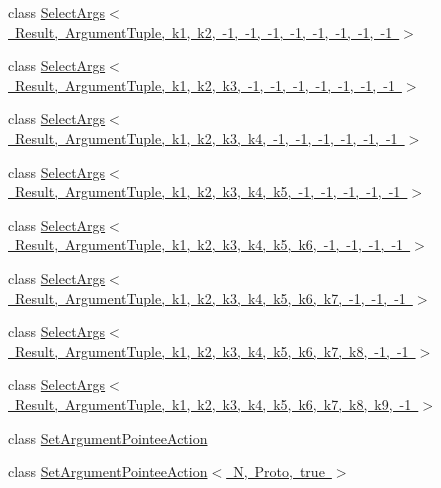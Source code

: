 \begin{DoxyCompactItemize}
\item 
class \mbox{\hyperlink{classtesting_1_1internal_1_1SelectArgs_3_01Result_00_01ArgumentTuple_00_01k1_00_01k2_00_01-1_00_9a332764141890440172b7f06e77bbee}{Select\+Args$<$ Result, Argument\+Tuple, k1, k2, -\/1, -\/1, -\/1, -\/1, -\/1, -\/1, -\/1, -\/1 $>$}}
\item 
class \mbox{\hyperlink{classtesting_1_1internal_1_1SelectArgs_3_01Result_00_01ArgumentTuple_00_01k1_00_01k2_00_01k3_00_4b8877f94cb457a4d2bd6b2630090309}{Select\+Args$<$ Result, Argument\+Tuple, k1, k2, k3, -\/1, -\/1, -\/1, -\/1, -\/1, -\/1, -\/1 $>$}}
\item 
class \mbox{\hyperlink{classtesting_1_1internal_1_1SelectArgs_3_01Result_00_01ArgumentTuple_00_01k1_00_01k2_00_01k3_00_030eb2335b9fd029fe61511c21b4d364}{Select\+Args$<$ Result, Argument\+Tuple, k1, k2, k3, k4, -\/1, -\/1, -\/1, -\/1, -\/1, -\/1 $>$}}
\item 
class \mbox{\hyperlink{classtesting_1_1internal_1_1SelectArgs_3_01Result_00_01ArgumentTuple_00_01k1_00_01k2_00_01k3_00_dabb861d0dfd59e876e4adc8d7e61c25}{Select\+Args$<$ Result, Argument\+Tuple, k1, k2, k3, k4, k5, -\/1, -\/1, -\/1, -\/1, -\/1 $>$}}
\item 
class \mbox{\hyperlink{classtesting_1_1internal_1_1SelectArgs_3_01Result_00_01ArgumentTuple_00_01k1_00_01k2_00_01k3_00_bb7097ad0bebc299c171ea7e2f7fc9a0}{Select\+Args$<$ Result, Argument\+Tuple, k1, k2, k3, k4, k5, k6, -\/1, -\/1, -\/1, -\/1 $>$}}
\item 
class \mbox{\hyperlink{classtesting_1_1internal_1_1SelectArgs_3_01Result_00_01ArgumentTuple_00_01k1_00_01k2_00_01k3_00_39929402cb68b57f60e280a41eb60fed}{Select\+Args$<$ Result, Argument\+Tuple, k1, k2, k3, k4, k5, k6, k7, -\/1, -\/1, -\/1 $>$}}
\item 
class \mbox{\hyperlink{classtesting_1_1internal_1_1SelectArgs_3_01Result_00_01ArgumentTuple_00_01k1_00_01k2_00_01k3_00_5bf9522b4f7bab9048d7587f1d9fbf27}{Select\+Args$<$ Result, Argument\+Tuple, k1, k2, k3, k4, k5, k6, k7, k8, -\/1, -\/1 $>$}}
\item 
class \mbox{\hyperlink{classtesting_1_1internal_1_1SelectArgs_3_01Result_00_01ArgumentTuple_00_01k1_00_01k2_00_01k3_00_a44b2a3fb6bab261818c61ba2b7f389a}{Select\+Args$<$ Result, Argument\+Tuple, k1, k2, k3, k4, k5, k6, k7, k8, k9, -\/1 $>$}}
\item 
class \mbox{\hyperlink{classtesting_1_1internal_1_1SetArgumentPointeeAction}{Set\+Argument\+Pointee\+Action}}
\item 
class \mbox{\hyperlink{classtesting_1_1internal_1_1SetArgumentPointeeAction_3_01N_00_01Proto_00_01true_01_4}{Set\+Argument\+Pointee\+Action$<$ N, Proto, true $>$}}

\end{DoxyCompactItemize}
